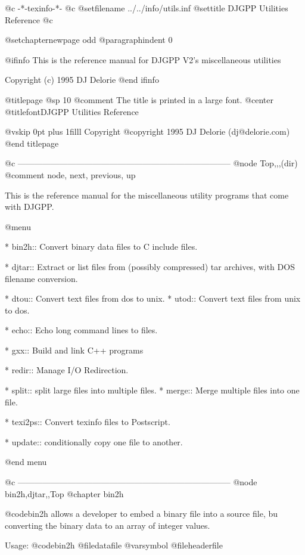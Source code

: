    @c -*-texinfo-*-
@c %
@setfilename ../../info/utils.inf
@settitle DJGPP Utilities Reference
@c %

@setchapternewpage odd
@paragraphindent 0

@ifinfo
This is the reference manual for DJGPP V2's miscellaneous utilities

Copyright (c) 1995 DJ Delorie
@end ifinfo

@titlepage
@sp 10
@comment The title is printed in a large font.
@center @titlefont{DJGPP Utilities Reference}

@vskip 0pt plus 1filll
Copyright @copyright{} 1995 DJ Delorie (dj@delorie.com)
@end titlepage

@c -----------------------------------------------------------------------------
@node Top,,,(dir)
@comment node, next, previous, up

This is the reference manual for the miscellaneous utility programs that
come with DJGPP.

@menu

* bin2h::       Convert binary data files to C include files.

* djtar::       Extract or list files from (possibly compressed)
		tar archives, with DOS filename conversion.

* dtou::        Convert text files from dos to unix.
* utod::        Convert text files from unix to dos.

* echo::        Echo long command lines to files.

* gxx::         Build and link C++ programs

* redir::       Manage I/O Redirection.

* split::       split large files into multiple files.
* merge::       Merge multiple files into one file.

* texi2ps::     Convert texinfo files to Postscript.

* update::      conditionally copy one file to another.

@end menu

@c -----------------------------------------------------------------------------
@node bin2h,djtar,,Top
@chapter bin2h

@code{bin2h} allows a developer to embed a binary file into a source
file, bu converting the binary data to an array of integer values.

Usage: @code{bin2h} @file{datafile} @var{symbol} @file{headerfile}

